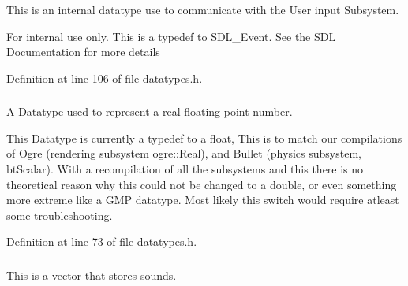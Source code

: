 \hypertarget{namespacephys_a8126d26e4507e66d09876988bb941fd4}{
\subsubsection[{RawEvent}]{}}
\label{df/dec/namespacephys_a8126d26e4507e66d09876988bb941fd4}


This is an internal datatype use to communicate with the User input Subsystem. 

\begin{DoxyInternal}{For internal use only.}
This is a typedef to SDL\_\-Event. See the SDL Documentation for more details \end{DoxyInternal}


Definition at line 106 of file datatypes.h.

\hypertarget{namespacephys_af7eb897198d265b8e868f45240230d5f}{
\subsubsection[{Real}]{}}
\label{df/dec/namespacephys_af7eb897198d265b8e868f45240230d5f}


A Datatype used to represent a real floating point number. 

This Datatype is currently a typedef to a float, This is to match our compilations of Ogre (rendering subsystem ogre::Real), and Bullet (physics subsystem, btScalar). With a recompilation of all the subsystems and this there is no theoretical reason why this could not be changed to a double, or even something more extreme like a GMP datatype. Most likely this switch would require atleast some troubleshooting. 

Definition at line 73 of file datatypes.h.

\hypertarget{namespacephys_ab780c3162da5699fe421f3739ba03fc4}{
\subsubsection[{SoundSet}]{}}
\label{df/dec/namespacephys_ab780c3162da5699fe421f3739ba03fc4}


This is a vector that stores sounds. 

